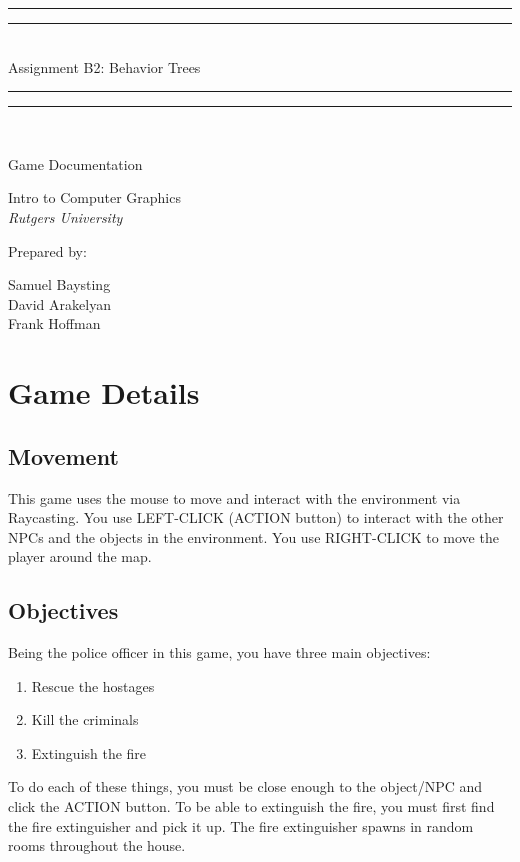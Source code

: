 \documentclass[12pt]{article}
\newcommand*{\titleGP}{\begingroup %
\centering %
\vspace*{\baselineskip} %

\rule{\textwidth}{1.6pt}\vspace*{-\baselineskip}\vspace*{2pt} %
\rule{\textwidth}{0.4pt}\\[\baselineskip] %

{\LARGE Assignment B2: Behavior Trees\\[0.2\baselineskip]} %

\rule{\textwidth}{0.4pt}\vspace*{-\baselineskip}\vspace{3.2pt} %
\rule{\textwidth}{1.6pt}\\[\baselineskip]%
\vspace{200pt}

\scshape %
\bf %
{\large Game Documentation\par}
\vspace*{2\baselineskip} %
Intro to Computer Graphics\\
{\itshape Rutgers University}\\[\baselineskip] %
\vspace*{2\baselineskip} %

Prepared by: \\[\baselineskip]
{\Large Samuel Baysting \\ David Arakelyan \\ Frank Hoffman\par}
 



\vfill %



\endgroup}
\begin{document}
\begin{titlepage}
\pagestyle{empty} %
\setlength{\parindent}{1cm} %


\titleGP
\end{titlepage}


\newpage
\tableofcontents
\newpage


\section*{\center Game Details}
\vspace{10pt}

\subsection*{Movement}

This game uses the mouse to move and interact with the environment via Raycasting. You use LEFT-CLICK (ACTION button) to interact with the other NPCs and the objects in the environment. You use RIGHT-CLICK to move the player around the map.\\ 

\subsection*{Objectives}

Being the police officer in this game, you have three main objectives:

\begin{enumerate}
	\item Rescue the hostages
	\item Kill the criminals
	\item Extinguish the fire
\end{enumerate} 

To do each of these things, you must be close enough to the object/NPC and click the ACTION button. To be able to extinguish the fire, you must first find the fire extinguisher and pick it up. The fire extinguisher spawns in random rooms throughout the house. \\
\end{document}
